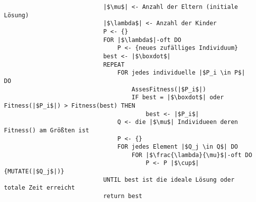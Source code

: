 \begin{itemize}
\begin{itemize}
\begin{itemize}
\begin{verbatim}
                            |$\mu$| <- Anzahl der Eltern (initiale Lösung)
                            |$\lambda$| <- Anzahl der Kinder
                            P <- {}
                            FOR |$\lambda$|-oft DO
                                P <- {neues zufälliges Individuum}
                            best <- |$\boxdot$|
                            REPEAT
                                FOR jedes individuelle |$P_i \in P$| DO
                                    AssesFitness(|$P_i$|)
                                    IF best = |$\boxdot$| oder Fitness(|$P_i$|) > Fitness(best) THEN
                                        best <- |$P_i$|
                                Q <- die |$\mu$| Individueen deren Fitness() am Größten ist
                                P <- {}
                                FOR jedes Element |$Q_j \in Q$| DO
                                    FOR |$\frac{\lambda}{\mu}$|-oft DO
                                        P <- P |$\cup$| {MUTATE(|$Q_j$|)}
                            UNTIL best ist die ideale Lösung oder totale Zeit erreicht
                            return best
                            \end{verbatim}
                    \end{itemize}
            \end{itemize}
    \end{itemize}

